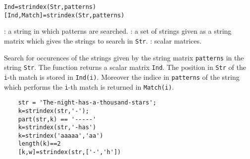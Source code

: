 
\begin{mandesc}
\end{mandesc}
\begin{calling_sequence}
\begin{verbatim}
Ind=strindex(Str,patterns)
[Ind,Match]=strindex(Str,patterns)
\end{verbatim}
\end{calling_sequence}

\begin{parameters}
  \begin{varlist}
    : a string in which patterns are searched.
    : a set of strings given as a string matrix which gives the 
    strings to search in \verb!Str!.
    : scalar matrices.
  \end{varlist}
\end{parameters}

\begin{mandescription}
Search for occurences of the strings given by the string matrix \verb!patterns! 
in the string \verb!Str!. The function returns a scalar matrix \verb!Ind!.
The position in \verb!Str! of the \verb+i+-th match is stored in \verb+Ind(i)+.
Moreover the indice in \verb!patterns! of the string which performs the \verb+i+-th 
match is returned in  \verb+Match(i)+.
\end{mandescription}
\begin{examples}
  \begin{Verbatim}
    str = 'The-night-has-a-thousand-stars';
    k=strindex(str,'-');
    part(str,k) == '-----' 
    k=strindex(str,'-has') 
    k=strindex('aaaaa','aa')
    length(k)==2 
    [k,w]=strindex(str,['-','h'])
  \end{Verbatim}
\end{examples}
\begin{manseealso}
     
\end{manseealso}
